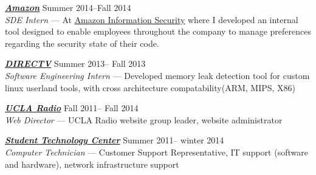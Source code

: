 \documentclass[line,letterpaper]{resume}
\begin{document}
\begin{resume}
	{\sl\textbf{\href{www.amazon.com}{Amazon}}} \hfill Summer 2014--Fall 2014\\
    \emph{SDE Intern} --- At \underline{\href{https://www.amazon.jobs/en/teams/infosec}
    {Amazon Information Security}} where I developed an internal tool designed to
	enable employees throughout the company to manage preferences regarding the
	security state of their code.

    {\sl\textbf{\href{www.directv.com}{DIRECTV}}} \hfill Summer 2013-- Fall 2013\\
    \emph{Software Engineering Intern}
    ---  Developed memory leak detection tool for custom linux userland tools,
	with cross architecture compatability(ARM, MIPS, X86)

    {\sl\textbf{\href{www.uclaradio.com}{UCLA Radio}}} \hfill Fall 2011-- Fall 2014\\
    \emph{Web Director} --- UCLA Radio website group leader, website administrator

    {\sl\textbf{\href{https://housing.ucla.edu/residence-hall-computing}
	{Student Technology Center}}} \hfill Summer 2011-- winter 2014\\
    \emph{Computer Technician} --- Customer Support Representative,
IT support (software and hardware), network infrastructure support
    \vspace{-6pt}



\end{resume}
\end{document}
